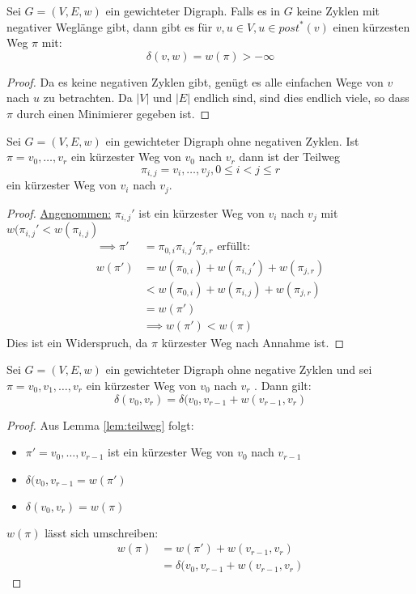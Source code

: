 \begin{lemma}
	Sei $G=(V,E,w)$  ein gewichteter Digraph. Falls es in $G$ keine Zyklen mit negativer Weglänge gibt, dann gibt es für $v,u \in V, u \in  post^{*}(v)$ einen kürzesten Weg $\pi$ mit:
	\[
	\delta(v,w) = w(\pi) > -\infty
	\]
\end{lemma}
\begin{proof}
Da es keine negativen Zyklen gibt, genügt es alle einfachen Wege von $v$ nach $u$ zu betrachten. Da $|V|$ und $|E|$ endlich sind, sind dies endlich viele, so dass $\pi$ durch einen Minimierer gegeben ist.
\end{proof}

\begin{lemma}
	\label{lem:teilweg}
	Sei $G=(V,E,w)$ ein gewichteter Digraph ohne negativen Zyklen. Ist $\pi= v_0, \ldots, v_r$ ein kürzester Weg von $v_0$  nach $v_r$ dann ist der Teilweg
	\[
		\pi_{i,j} =v_i,\ldots,v_j, 0\le i  <j \le r
	\]
ein kürzester Weg von $v_i$ nach $v_j$.
\end{lemma}
\begin{proof}
\underline{Angenommen:} $\pi_{i,j}'$ ist ein kürzester Weg von $v_i$ nach $v_j$ mit $w(\pi_{i,j}'  < w (\pi_{i,j})$
\begin{align*}
	\implies \pi' &= \pi_{0,i} \pi_{i,j}' \pi_{j,r} \text{ erfüllt:}\\
	w(\pi')&= w(\pi_{0,i})+w(\pi_{i,j}')+w(\pi_{j,r}) \\
	       &< w(\pi_{0,i})+ w(\pi_{i,j}) + w(\pi_{j,r})\\
	       &= w(\pi') \\
	       &\implies w(\pi') < w(\pi)
\end{align*}
Dies ist ein Widerspruch, da $\pi$ kürzester Weg nach Annahme ist.
\end{proof}
\begin{lemma}
	\label{lem:delta_delta_w}
	Sei $G=(V,E,w)$ ein gewichteter Digraph ohne negative Zyklen und sei $\pi=v_0,v_1,\ldots,v_r$ ein kürzester Weg von $v_0$ nach $v_r$ . Dann gilt:
	\[
	\delta(v_0,v_r)= \delta(v_0, v_{r-1} + w(v_{r-1}, v_r)
	\]
\end{lemma}
\begin{proof}
Aus Lemma \ref{lem:teilweg} folgt:
\begin{itemize}
	\item $\pi' = v_0,\ldots, v_{r-1}$ ist ein kürzester Weg von $v_0$ nach $v_{r-1}$
	\item $\delta(v_0,v_{r-1} = w(\pi')$
	\item $\delta(v_0,v_r)= w(\pi)$	
\end{itemize}
$w(\pi)$ lässt sich umschreiben:
\begin{align*}
	w(\pi)&= w(\pi')+w(v_{r-1},v_r) \\
	      &= \delta(v_0,v_{r-1} + w(v_{r-1},v_r)
\end{align*}
\end{proof}

